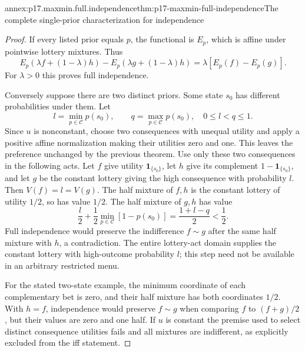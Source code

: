 \begin{annexitem}{annex:p17.maxmin.full.independence}{thm:p17-maxmin-full-independence}{The complete single-prior characterization for independence}
\begin{proof}
If every listed prior equals \(p\), the
functional is \(E_p\), which is affine under
pointwise lottery mixtures. Thus
\[
 E_p(\lambda f+(1-\lambda)h)
       -E_p(\lambda g+(1-\lambda)h)
                        =\lambda[E_p(f)-E_p(g)].
\]
For \(\lambda>0\) this proves full independence.

Conversely suppose there are two distinct
priors. Some state \(s_0\) has different
probabilities under them. Let
\[
       l=\min_{p\in\mathcal C}p(s_0),\qquad
       q=\max_{p\in\mathcal C}p(s_0),
                           \quad 0\leq l<q\leq1.
\]
Since \(u\) is nonconstant, choose two
consequences with unequal utility and apply
a positive affine normalization making their
utilities zero and one. This leaves the
preference unchanged by the previous theorem.
Use only these two consequences in the
following acts.
Let \(f\) give utility \(\mathbf1_{\{s_0\}}\),
let \(h\) give its complement
\(1-\mathbf1_{\{s_0\}}\), and let \(g\)
be the constant lottery giving the high
consequence with probability \(l\).
Then \(V(f)=l=V(g)\).
The half mixture of \(f,h\) is the
constant lottery of utility \(1/2\), so
has value \(1/2\).
The half mixture of \(g,h\) has value
\[
          \frac l2+\frac12
                   \min_{p\in\mathcal C}[1-p(s_0)]
                       =\frac{1+l-q}{2}<\frac12.
\]
Full independence would preserve the
indifference \(f\sim g\) after the
same half mixture with \(h\), a
contradiction. The entire lottery-act
domain supplies the constant lottery
with high-outcome probability \(l\);
this step need not be available in
an arbitrary restricted menu.

For the stated two-state example,
the minimum coordinate of each
complementary bet is zero, and their
half mixture has both coordinates
\(1/2\). With \(h=f\), independence
would preserve \(f\sim g\) when
comparing \(f\) to \((f+g)/2\),
but their values are zero and one half.
If \(u\) is constant the premise used
to select distinct consequence utilities
fails and all mixtures are indifferent,
as explicitly excluded from the iff
statement.
\end{proof}
\end{annexitem}

